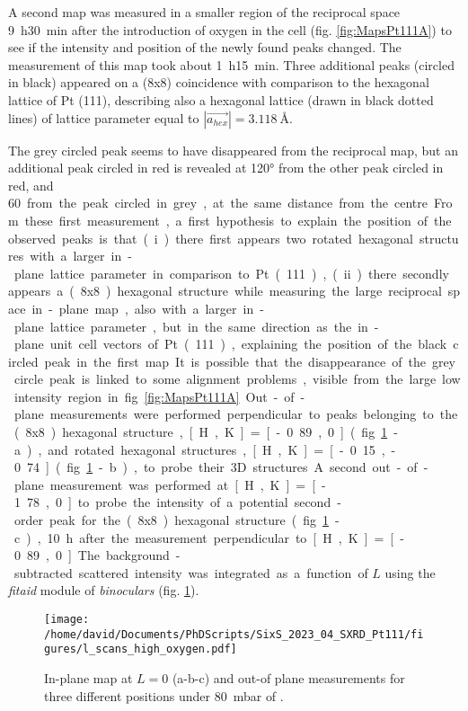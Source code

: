 A second map was measured in a smaller region of the reciprocal space \qty{9}{\hour}\qty{30}{\minute} after the introduction of oxygen in the cell (fig. \ref{fig:MapsPt111A}) to see if the intensity and position of the newly found peaks changed.
The measurement of this map took about \qty{1}{\hour}\qty{15}{\minute}.
Three additional peaks (circled in black) appeared on a (8x8) coincidence with comparison to the hexagonal lattice of Pt (111), describing also a hexagonal lattice (drawn in black dotted lines) of lattice parameter equal to $|\vec{a_{hex}}| = \qty{3.118}{\angstrom}$.

The grey circled peak seems to have disappeared from the reciprocal map, but an additional peak circled in red is revealed at \ang{120} from the other peak circled in red, and \qty{60} from the peak circled in grey, at the same distance from the centre.
From these first measurement, a first hypothesis to explain the position of the observed peaks is that (i) there first appears two rotated hexagonal structures with a larger in-plane lattice parameter in comparison to Pt (111), (ii) there secondly appears a (8x8) hexagonal structure while measuring the large reciprocal space in-plane map, also with a larger in-plane lattice parameter, but in the same direction as the in-plane unit cell vectors of Pt (111), explaining the position of the black circled peak in the first map.
It is possible that the disappearance of the grey circle peak is linked to some alignment problems, visible from the large low intensity region in fig. \ref{fig:MapsPt111A}.

Out-of-plane measurements were performed perpendicular to peaks belonging to the (8x8) hexagonal structure, [H, K] = [-0.89, 0] (fig. \ref{fig:LScans80} - a), and rotated hexagonal structures, [H, K] = [-0.15, -0.74] (fig. \ref{fig:LScans80} - b), to probe their 3D structures.
A second out-of-plane measurement was performed at [H, K] = [-1.78, 0] to probe the intensity of a potential second-order peak for the (8x8) hexagonal structure (fig. \ref{fig:LScans80} - c), \qty{10}{\hour} after the measurement perpendicular to [H, K] = [-0.89, 0].
The background-subtracted scattered intensity was integrated as a function of $L$ using the \textit{fitaid} module of \textit{binoculars} (fig. \ref{fig:LScans80}).

\begin{figure}[!htb]
    \centering
    \texttt{[image: /home/david/Documents/PhDScripts/SixS\_2023\_04\_SXRD\_Pt111/figures/l\_scans\_high\_oxygen.pdf]}
    \caption{
        In-plane map at $L=0$ (a-b-c) and out-of plane measurements for three different positions under \qty{80}{\milli\bar} of .
    }
    \label{fig:LScans80}
\end{figure}

